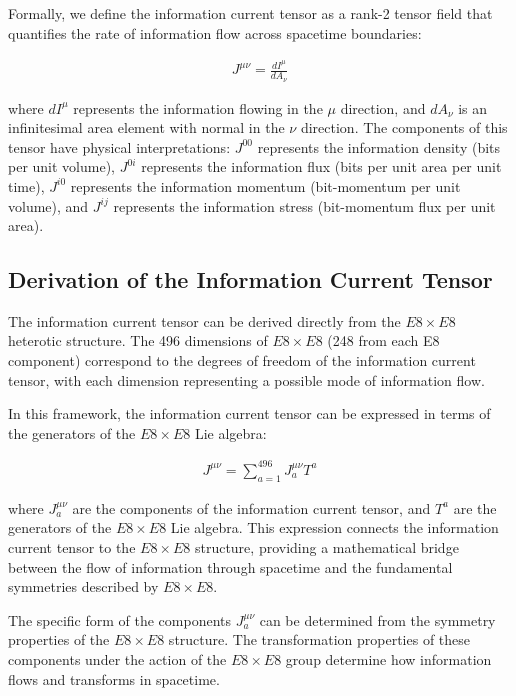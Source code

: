 \documentclass[11pt,english,twoside]{article}
\begin{document}
Formally, we define the information current tensor as a rank-2 tensor field that quantifies the rate of information flow across spacetime boundaries:

\begin{align}
    J^{\mu\nu} = \frac{dI^{\mu}}{dA_{\nu}}
\end{align}

where $dI^{\mu}$ represents the information flowing in the $\mu$ direction, and $dA_{\nu}$ is an infinitesimal area element with normal in the $\nu$ direction. The components of this tensor have physical interpretations: $J^{00}$ represents the information density (bits per unit volume), $J^{0i}$ represents the information flux (bits per unit area per unit time), $J^{i0}$ represents the information momentum (bit-momentum per unit volume), and $J^{ij}$ represents the information stress (bit-momentum flux per unit area).

\subsection{Derivation of the Information Current Tensor}

The information current tensor can be derived directly from the $E8\times E8$ heterotic structure. The 496 dimensions of $E8\times E8$ (248 from each E8 component) correspond to the degrees of freedom of the information current tensor, with each dimension representing a possible mode of information flow.

In this framework, the information current tensor can be expressed in terms of the generators of the $E8\times E8$ Lie algebra:

\begin{align}
    J^{\mu\nu} = \sum_{a=1}^{496} J_a^{\mu\nu} T^a
\end{align}

where $J_a^{\mu\nu}$ are the components of the information current tensor, and $T^a$ are the generators of the $E8\times E8$ Lie algebra. This expression connects the information current tensor to the $E8\times E8$ structure, providing a mathematical bridge between the flow of information through spacetime and the fundamental symmetries described by $E8\times E8$.

The specific form of the components $J_a^{\mu\nu}$ can be determined from the symmetry properties of the $E8\times E8$ structure. The transformation properties of these components under the action of the $E8\times E8$ group determine how information flows and transforms in spacetime.
\end{document}
